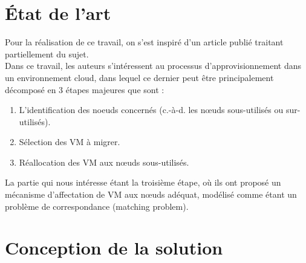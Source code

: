 \section{État de l’art}
Pour la réalisation de ce travail, on s’est inspiré d’un article publié  traitant partiellement du sujet. \\
Dans ce travail, les auteurs s’intéressent au processus d'approvisionnement dans un environnement cloud, dans lequel ce dernier peut être principalement décomposé en 3 étapes majeures que sont : 
\begin{enumerate}
    \item L’identification des noeuds concernés (c.-à-d. les nœuds sous-utilisés ou sur-utilisés). 
    \item Sélection des VM à migrer.
    \item Réallocation des VM aux nœuds sous-utilisés.
\end{enumerate}
La partie qui nous intéresse étant la troisième étape,  où ils ont proposé un mécanisme d’affectation de VM aux nœuds adéquat, modélisé comme étant un problème de correspondance (matching problem).
\section{Conception de la solution}
